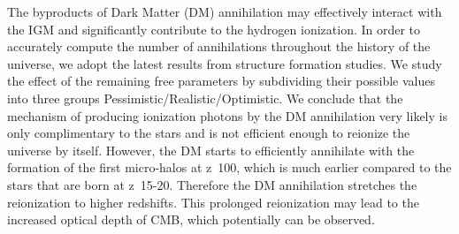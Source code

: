 The byproducts of Dark Matter (DM) annihilation may effectively interact with the IGM and significantly contribute to the hydrogen ionization. In order to accurately compute the number of annihilations throughout the history of the universe, we adopt the latest results from structure formation studies. We study the effect of the remaining free parameters by subdividing their possible values into three groups Pessimistic/Realistic/Optimistic. We conclude that the mechanism of producing ionization photons by the DM annihilation very likely is only complimentary to the stars and is not efficient enough to reionize the universe by itself. However, the DM starts to efficiently annihilate with the formation of the first micro-halos at z~100, which is much earlier compared to the stars that are born at z~15-20. Therefore the DM annihilation stretches the reionization to higher redshifts. This prolonged reionization may lead to the increased optical depth of CMB, which potentially can be observed.
  